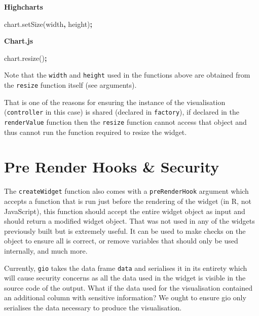 \documentclass[
]{krantz}
\makeatletter
\newenvironment{Shaded}{\begin{snugshade}}{\end{snugshade}}
\newcommand{\AttributeTok}[1]{\textcolor[rgb]{0.61,0.61,0.61}{#1}}
\newcommand{\NormalTok}[1]{#1}
\newcommand{\OperatorTok}[1]{\textcolor[rgb]{0.43,0.43,0.43}{\textbf{#1}}}
\newcommand{\VariableTok}[1]{\textcolor[rgb]{0,0,0}{#1}}
\newenvironment{kframe}{%
\medskip{}
\setlength{\fboxsep}{.8em}
 \def\at@end@of@kframe{}%
 \ifinner\ifhmode%
  \def\at@end@of@kframe{\end{minipage}}%
  \begin{minipage}{\columnwidth}%
 \fi\fi%
 \def\FrameCommand##1{\hskip\@totalleftmargin \hskip-\fboxsep
 \colorbox{shadecolor}{##1}\hskip-\fboxsep
     \hskip-\linewidth \hskip-\@totalleftmargin \hskip\columnwidth}%
 \MakeFramed {\advance\hsize-\width
   \@totalleftmargin\z@ \linewidth\hsize
   \@setminipage}}%
 {\par\unskip\endMakeFramed%
 \at@end@of@kframe}
\renewenvironment{Shaded}{\begin{kframe}}{\end{kframe}}
\makeatother
\begin{document}
\textbf{Highcharts}

\begin{Shaded}
\begin{Highlighting}[]
\VariableTok{chart}\NormalTok{.}\AttributeTok{setSize}\NormalTok{(width}\OperatorTok{,}\NormalTok{ height)}\OperatorTok{;}
\end{Highlighting}
\end{Shaded}

\textbf{Chart.js}

\begin{Shaded}
\begin{Highlighting}[]
\VariableTok{chart}\NormalTok{.}\AttributeTok{resize}\NormalTok{()}\OperatorTok{;}
\end{Highlighting}
\end{Shaded}

Note that the \texttt{width} and \texttt{height} used in the functions above are obtained from the \texttt{resize} function itself (see arguments).

That is one of the reasons for ensuring the instance of the visualisation (\texttt{controller} in this case) is shared (declared in \texttt{factory}), if declared in the \texttt{renderValue} function then the \texttt{resize} function cannot access that object and thus cannot run the function required to resize the widget.

\hypertarget{widgets-adv-prerender}{%
\section{Pre Render Hooks \& Security}\label{widgets-adv-prerender}}

The \texttt{createWidget} function also comes with a \texttt{preRenderHook} argument which accepts a function that is run just before the rendering of the widget (in R, not JavaScript), this function should accept the entire widget object as input and should return a modified widget object. That was not used in any of the widgets previously built but is extremely useful. It can be used to make checks on the object to ensure all is correct, or remove variables that should only be used internally, and much more.

Currently, \texttt{gio} takes the data frame \texttt{data} and serialises it in its entirety which will cause security concerns as all the data used in the widget is visible in the source code of the output. What if the data used for the visualisation contained an additional column with sensitive information? We ought to ensure gio only serialises the data necessary to produce the visualisation.
\end{document}
